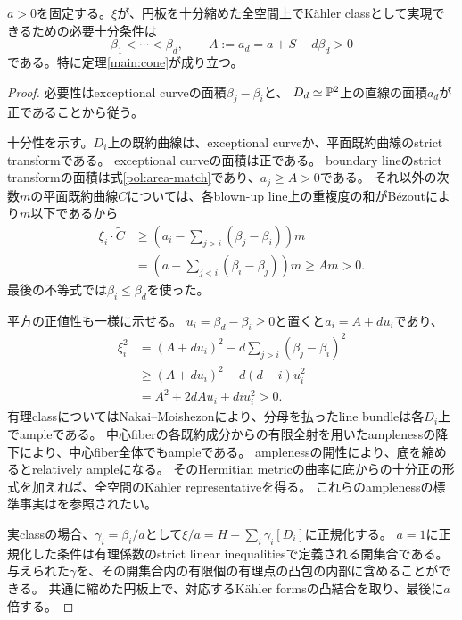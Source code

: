 \begin{theorem}\label{pol:cone}
$a>0$を固定する。$\xi$が、円板を十分縮めた全空間上でKähler classとして実現できるための必要十分条件は
\begin{equation}\label{pol:inequalities}
\beta_1<\cdots<\beta_d,
\qquad A:=a_d=a+S-d\beta_d>0
\end{equation}
である。特に定理\ref{main:cone}が成り立つ。
\end{theorem}
\begin{proof}
必要性はexceptional curveの面積$\beta_j-\beta_i$と、
$D_d\simeq\mathbb P^2$上の直線の面積$a_d$が正であることから従う。

十分性を示す。$D_i$上の既約曲線は、exceptional curveか、平面既約曲線のstrict transformである。
exceptional curveの面積は正である。
boundary lineのstrict transformの面積は式\eqref{pol:area-match}であり、$a_j\ge A>0$である。
それ以外の次数$m$の平面既約曲線$C$については、各blown-up line上の重複度の和がBézoutにより$m$以下であるから
\begin{align*}
\xi_i\cdot\widetilde C
&\ge\left(a_i-\sum_{j>i}(\beta_j-\beta_i)\right)m\\
&=\left(a-\sum_{j<i}(\beta_i-\beta_j)\right)m
\ge A m>0.
\end{align*}
最後の不等式では$\beta_i\le\beta_d$を使った。

平方の正値性も一様に示せる。
$u_i=\beta_d-\beta_i\ge0$と置くと$a_i=A+du_i$であり、
\begin{align*}
\xi_i^2
&=(A+du_i)^2-d\sum_{j>i}(\beta_j-\beta_i)^2\\
&\ge(A+du_i)^2-d(d-i)u_i^2\\
&=A^2+2dAu_i+diu_i^2>0.
\end{align*}
有理classについてはNakai--Moishezon\cite[Chapter V, Theorem 1.10]{Hartshorne}により、分母を払ったline bundleは各$D_i$上でampleである。
中心fiberの各既約成分からの有限全射を用いたamplenessの降下により、中心fiber全体でもampleである。
amplenessの開性により、底を縮めるとrelatively ampleになる。
そのHermitian metricの曲率に底からの十分正の形式を加えれば、全空間のKähler representativeを得る。
これらのamplenessの標準事実は\cite{StacksAmpleness}を参照されたい。

実classの場合、$\gamma_i=\beta_i/a$として$\xi/a=H+\sum_i\gamma_i[D_i]$に正規化する。
$a=1$に正規化した条件は有理係数のstrict linear inequalitiesで定義される開集合である。
与えられた$\gamma$を、その開集合内の有限個の有理点の凸包の内部に含めることができる。
共通に縮めた円板上で、対応するKähler formsの凸結合を取り、最後に$a$倍する。
\end{proof}

